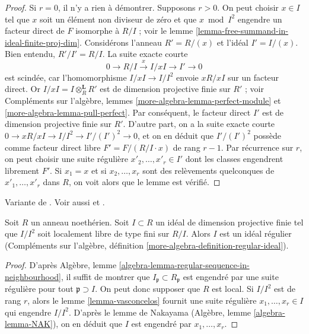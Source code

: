 \begin{proof}
Si $r = 0$, il n'y a rien à démontrer. Supposons $r > 0$. On peut choisir
$x \in I$ tel que $x$ soit un élément non diviseur de zéro et que $x \bmod I^2$
engendre un facteur direct de $F$ isomorphe à $R/I$ ; voir
le lemme \ref{lemma-free-summand-in-ideal-finite-proj-dim}.
Considérons l'anneau $R' = R/(x)$ et l'idéal $I' = I/(x)$.
Bien entendu, $R'/I' = R/I$. La suite exacte courte
$$
0 \to R/I \xrightarrow{x} I/xI \to I' \to 0
$$
est scindée, car l'homomorphisme $I/xI \to I/I^2$ envoie $xR/xI$
sur un facteur direct. Or $I/xI = I \otimes_R^\mathbf{L} R'$ est de
dimension projective finie sur $R'$ ; voir
Compléments sur l'algèbre, lemmes \ref{more-algebra-lemma-perfect-module} et
\ref{more-algebra-lemma-pull-perfect}.
Par conséquent, le facteur direct $I'$ est de dimension projective finie sur $R'$.
D'autre part, on a la suite exacte courte
$0 \to xR/xI \to I/I^2 \to I'/(I')^2 \to 0$, et on en déduit que
$I'/(I')^2$ possède comme facteur direct libre $F' = F/(R/I \cdot x)$
de rang $r - 1$. Par récurrence sur $r$,
on peut choisir une suite régulière $x'_2, \ldots, x'_r \in I'$
dont les classes engendrent librement $F'$.
Si $x_1 = x$ et si $x_2, \ldots, x_r$ sont des relèvements quelconques de
$x'_1, \ldots, x'_r$ dans $R$, on voit alors que le lemme est vérifié.
\end{proof}

\begin{proposition}
\label{proposition-regular-ideal}
\begin{reference}
Variante de \cite[Corollary 1]{Vasconcelos}. Voir aussi
\cite{Iyengar} et \cite{Ferrand-lci}.
\end{reference}
Soit $R$ un anneau noethérien. Soit $I \subset R$ un idéal
de dimension projective finie tel que $I/I^2$ soit
localement libre de type fini sur $R/I$. Alors $I$ est un idéal régulier
(Compléments sur l'algèbre, définition \ref{more-algebra-definition-regular-ideal}).
\end{proposition}

\begin{proof}
D'après Algèbre, lemme \ref{algebra-lemma-regular-sequence-in-neighbourhood},
il suffit de montrer que $I_\mathfrak p \subset R_\mathfrak p$ est engendré
par une suite régulière pour tout $\mathfrak p \supset I$. On peut donc
supposer que $R$ est local. Si $I/I^2$ est de rang $r$, alors le
lemme \ref{lemma-vasconcelos} fournit une suite régulière
$x_1, \ldots, x_r \in I$ qui engendre $I/I^2$. D'après
le lemme de Nakayama (Algèbre, lemme \ref{algebra-lemma-NAK}),
on en déduit que $I$ est engendré par $x_1, \ldots, x_r$.
\end{proof}

